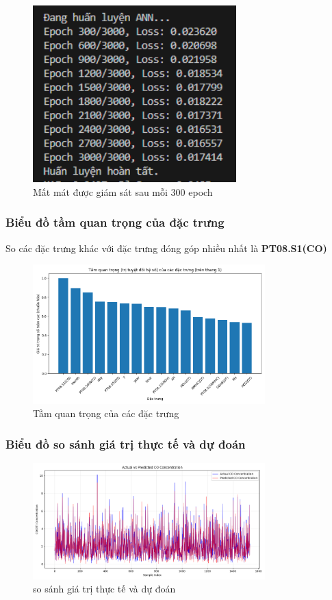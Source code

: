 \begin{figure}[H]
    \centering
    \includegraphics[width=0.7\textwidth]{images/ANN/300epoch.png}
    \caption{Mất mát được giám sát sau mỗi 300 epoch}
    \label{fig:ann}
\end{figure}

\subsubsection{Biểu đồ tầm quan trọng của đặc trưng}
So các đặc trưng khác với đặc trưng đóng góp nhiều nhất là \textbf{PT08.S1(CO)}
\begin{figure}[H]
    \centering
    \includegraphics[width=0.8\textwidth]{images/ANN/Tamquantrongdactrung.png}
    \caption{Tầm quan trọng của các đặc trưng}
    \label{fig:ann}
\end{figure}

\subsubsection{Biểu đồ so sánh giá trị thực tế và dự đoán}
\begin{figure}[H]
    \centering
    \includegraphics[width=0.8\textwidth]{images/ANN/SOkqANN.png}
    \caption{so sánh giá trị thực tế và dự đoán}
    \label{fig:ann}
\end{figure}

